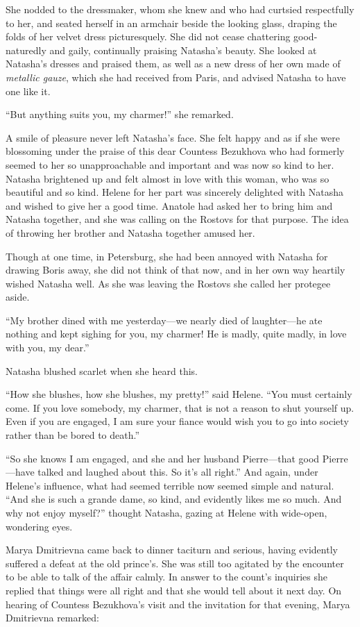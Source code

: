 She nodded to the dressmaker, whom she knew and who had curtsied
respectfully to her, and seated herself in an armchair beside the
looking glass, draping the folds of her velvet dress
picturesquely. She did not cease chattering good-naturedly and
gaily, continually praising Natasha's beauty. She looked at
Natasha's dresses and praised them, as well as a new dress of her
own made of \emph{metallic gauze}, which she had received from
Paris, and advised Natasha to have one like it.

``But anything suits you, my charmer!'' she remarked.

A smile of pleasure never left Natasha's face. She felt happy and
as if she were blossoming under the praise of this dear Countess
Bezukhova who had formerly seemed to her so unapproachable and
important and was now so kind to her. Natasha brightened up and
felt almost in love with this woman, who was so beautiful and so
kind. Helene for her part was sincerely delighted with Natasha
and wished to give her a good time.  Anatole had asked her to
bring him and Natasha together, and she was calling on the
Rostovs for that purpose. The idea of throwing her brother and
Natasha together amused her.

Though at one time, in Petersburg, she had been annoyed with
Natasha for drawing Boris away, she did not think of that now,
and in her own way heartily wished Natasha well. As she was
leaving the Rostovs she called her protegee aside.

``My brother dined with me yesterday---we nearly died of
laughter---he ate nothing and kept sighing for you, my charmer!
He is madly, quite madly, in love with you, my dear.''

Natasha blushed scarlet when she heard this.

``How she blushes, how she blushes, my pretty!'' said
Helene. ``You must certainly come. If you love somebody, my
charmer, that is not a reason to shut yourself up. Even if you
are engaged, I am sure your fiance would wish you to go into
society rather than be bored to death.''

``So she knows I am engaged, and she and her husband
Pierre---that good Pierre---have talked and laughed about
this. So it's all right.'' And again, under Helene's influence,
what had seemed terrible now seemed simple and natural. ``And she
is such a grande dame, so kind, and evidently likes me so
much. And why not enjoy myself?'' thought Natasha, gazing at
Helene with wide-open, wondering eyes.

Marya Dmitrievna came back to dinner taciturn and serious, having
evidently suffered a defeat at the old prince's. She was still
too agitated by the encounter to be able to talk of the affair
calmly. In answer to the count's inquiries she replied that
things were all right and that she would tell about it next
day. On hearing of Countess Bezukhova's visit and the invitation
for that evening, Marya Dmitrievna remarked:

